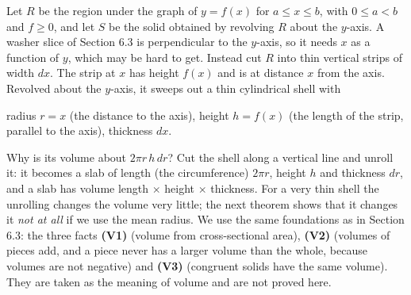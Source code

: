 \documentclass[11pt]{article}
\begin{document}
Let $R$ be the region under the graph of $y=f(x)$ for $a\le x\le b$, with $0\le a<b$ and $f\ge0$, and let $S$ be the solid obtained by revolving $R$ about the $y$-axis. A washer slice of Section 6.3 is perpendicular to the $y$-axis, so it needs $x$ as a function of $y$, which may be hard to get. Instead cut $R$ into thin vertical strips of width $dx$. The strip at $x$ has height $f(x)$ and is at distance $x$ from the axis. Revolved about the $y$-axis, it sweeps out a thin cylindrical shell with

\begin{center}
radius $r=x$ (the distance to the axis), \quad height $h=f(x)$ (the length of the strip, parallel to the axis), \quad thickness $dx$.
\end{center}

Why is its volume about $2\pi r\,h\,dr$? Cut the shell along a vertical line and unroll it: it becomes a slab of length (the circumference) $2\pi r$, height $h$ and thickness $dr$, and a slab has volume length $\times$ height $\times$ thickness. For a very thin shell the unrolling changes the volume very little; the next theorem shows that it changes it \emph{not at all} if we use the mean radius. We use the same foundations as in Section 6.3: the three facts \textbf{(V1)} (volume from cross-sectional area), \textbf{(V2)} (volumes of pieces add, and a piece never has a larger volume than the whole, because volumes are not negative) and \textbf{(V3)} (congruent solids have the same volume). They are taken as the meaning of volume and are not proved here.
\end{document}
